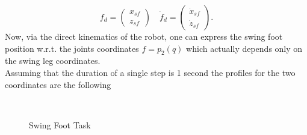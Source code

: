 \documentclass[11pt]{article}
\begin{document}
\begin{itemize}
\begin{equation}
\label{eqn:sf_task}
f_d = \begin{pmatrix}
x_{sf} \\
z_{sf}
\end{pmatrix} \quad \dot{f}_d = \begin{pmatrix}
\dot{x}_{sf} \\
\dot{z}_{sf}
\end{pmatrix}.
\end{equation}
Now, via the direct kinematics of the robot, one can express the swing foot position w.r.t. the joints coordinates $f=p_2(q)$ which actually depends only on the swing leg coordinates.\\
Assuming that the duration of a single step is 1 second the profiles for the two coordinates are the following
\begin{figure}[H]
\centering
{}
\\
\caption{Swing Foot Task}
\end{figure}
\end{itemize}
\end{document}
